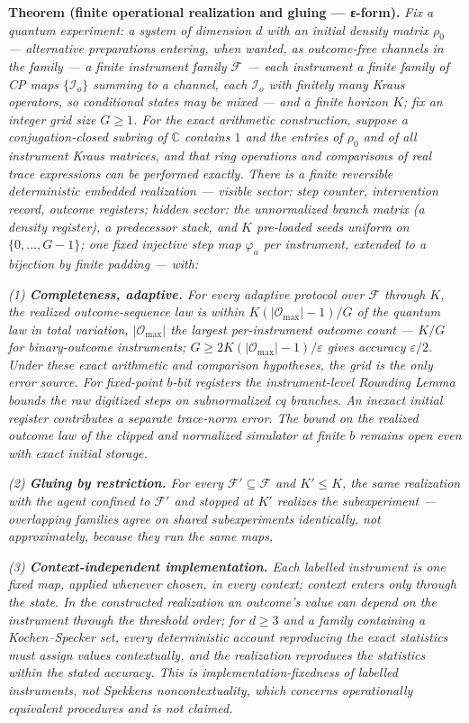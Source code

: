 \documentclass[
]{article}
\begin{document}
\textbf{Theorem (finite operational realization and gluing --- ε-form).}
\emph{Fix a quantum experiment: a system of dimension \(d\) with an
initial density matrix \(\rho_0\) --- alternative preparations entering,
when wanted, as outcome-free channels in the family --- a finite
instrument family \(\mathcal{F}\) --- each instrument a finite family of
CP maps \(\{\mathcal{I}_o\}\) summing to a channel, each
\(\mathcal{I}_o\) with finitely many Kraus operators, so conditional
states may be mixed --- and a finite horizon \(K\); fix an integer grid
size \(G \geq 1\). For the exact arithmetic construction, suppose a
conjugation-closed subring of \(\mathbb{C}\) contains \(1\) and the
entries of \(\rho_0\) and of all instrument Kraus matrices, and that
ring operations and comparisons of real trace expressions can be
performed exactly. There is a finite reversible deterministic embedded
realization --- visible sector: step counter, intervention record,
outcome registers; hidden sector: the unnormalized branch matrix (a
density register), a predecessor stack, and \(K\) pre-loaded seeds
uniform on \(\{0, \ldots, G{-}1\}\); one fixed injective step map
\(\varphi_a\) per instrument, extended to a bijection by finite padding
--- with:}

\emph{(1) \textbf{Completeness, adaptive.} For every adaptive protocol
over \(\mathcal{F}\) through \(K\), the realized outcome-sequence law is
within \(K(|\mathcal{O}_{\max}|{-}1)/G\) of the quantum law in total
variation, \(|\mathcal{O}_{\max}|\) the largest per-instrument outcome
count --- \(K/G\) for binary-outcome instruments;
\(G \geq 2K(|\mathcal{O}_{\max}|{-}1)/\varepsilon\) gives accuracy
\(\varepsilon/2\). Under these exact arithmetic and comparison
hypotheses, the grid is the only error source. For fixed-point \(b\)-bit
registers the instrument-level Rounding Lemma bounds the raw digitized
steps on subnormalized cq branches. An inexact initial register
contributes a separate trace-norm error. The bound on the realized
outcome law of the clipped and normalized simulator at finite \(b\)
remains open even with exact initial storage.}

\emph{(2) \textbf{Gluing by restriction.} For every
\(\mathcal{F}' \subseteq \mathcal{F}\) and \(K' \leq K\), the same
realization with the agent confined to \(\mathcal{F}'\) and stopped at
\(K'\) realizes the subexperiment --- overlapping families agree on
shared subexperiments identically, not approximately, because they run
the same maps.}

\emph{(3) \textbf{Context-independent implementation.} Each labelled
instrument is one fixed map, applied whenever chosen, in every context;
context enters only through the state. In the constructed realization an
outcome's value can depend on the instrument through the threshold
order; for \(d \geq 3\) and a family containing a Kochen--Specker set,
every deterministic account reproducing the exact statistics must assign
values contextually, and the realization reproduces the statistics
within the stated accuracy. This is implementation-fixedness of labelled
instruments, not Spekkens noncontextuality, which concerns operationally
equivalent procedures and is not claimed.}
\end{document}
